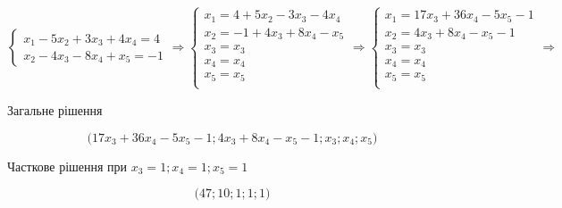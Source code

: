 $$
\begin{cases}
    x_1-5x_2+3x_3+4x_4=4 \\
    x_2-4x_3-8x_4+x_5=-1
  \end{cases}
  \Rightarrow \begin{cases}
    x_1=4+5x_2-3x_3-4x_4 \\
    x_2=-1+4x_3+8x_4-x_5 \\
    x_3 = x_3 \\
    x_4 = x_4 \\
    x_5 = x_5 \\
  \end{cases}
  \Rightarrow \begin{cases}
    x_1=17x_3+36x_4-5x_5-1 \\
    x_2=4x_3+8x_4-x_5-1\\
    x_3 = x_3 \\
    x_4 = x_4 \\
    x_5 = x_5 \\
  \end{cases}
  \Rightarrow
$$

Загальне рішення

$$
\Bigg( 17x_3+36x_4-5x_5-1; 4x_3+8x_4-x_5-1; x_3; x_4; x_5 \Bigg
)
$$

Часткове рішення при $x_3 = 1;x_4 = 1;x_5 = 1$

$$
\Bigg( 47; 10;  1; 1; 1 \Bigg)
$$
